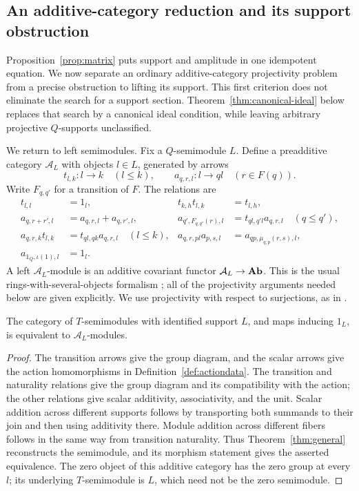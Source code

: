 \subsection{An additive-category reduction and its support obstruction}
\label{sec:ringoid}

Proposition~\ref{prop:matrix} puts support and amplitude in one idempotent
equation. We now separate an ordinary additive-category projectivity problem
from a precise obstruction to lifting its support. This first criterion does not eliminate the search for a support section.
Theorem~\ref{thm:canonical-ideal} below replaces that search by a canonical ideal condition, while leaving arbitrary projective $Q$-supports unclassified.

We return to left semimodules. Fix a $Q$-semimodule $L$. Define a preadditive category $\mathcal A_L$
with objects $l\in L$, generated by arrows
\[
 t_{l,k}:l\longrightarrow k\quad(l\leq k),\qquad
 a_{q,r,l}:l\longrightarrow ql\quad(r\in F(q)).
\]
Write $F_{q,q'}$ for a transition of $F$. The relations are
\begin{align*}
 t_{l,l}&=1_l,& t_{k,h}t_{l,k}&=t_{l,h},\\
 a_{q,r+r',l}&=a_{q,r,l}+a_{q,r',l},&
 a_{q',F_{q,q'}(r),l}&=t_{ql,q'l}a_{q,r,l}\quad(q\leq q'),\\
 a_{q,r,k}t_{l,k}&=t_{ql,qk}a_{q,r,l}\quad(l\leq k),&
 a_{q,r,pl}a_{p,s,l}&=a_{qp,\mu_{q,p}(r,s),l},\\
 a_{1_Q,\iota(1),l}&=1_l.&&
\end{align*}
A left $\mathcal A_L$-module is an additive covariant functor
$\mathcal A_L\to\mathbf{Ab}$. This is the usual rings-with-several-objects
formalism \cite{Mitchell,Murfet}; all of the projectivity arguments needed below
are given explicitly. We use projectivity with respect to surjections,
as in \cite[Definition~7.1, p.~18]{BorgerJun}.

\begin{proposition}\label{prop:ringoid}
The category of $T$-semimodules with identified support $L$, and maps
inducing $1_L$, is equivalent to $\mathcal A_L$-modules.
\end{proposition}
\begin{proof}
The transition arrows give the group diagram, and the scalar arrows give
the action homomorphisms in Definition~\ref{def:actiondata}. The transition and naturality relations give the group diagram and its
compatibility with the action; the other relations give scalar
additivity, associativity, and the unit. Scalar addition across
different supports follows by transporting both summands to their join
and then using additivity there. Module addition across different fibers
follows in the same way from transition naturality. Thus
Theorem~\ref{thm:general} reconstructs the semimodule, and its morphism
statement gives the asserted equivalence. The zero object of this
additive category has the zero group at every $l$; its underlying
$T$-semimodule is $L$, which need not be the zero semimodule.
\end{proof}

